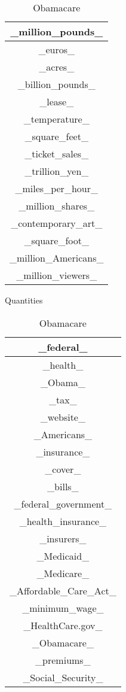 \documentclass{article}
\begin{document}
\begin{table}[ht]
{\begin{tabular}{|c|}
    \hline
    \_million\_pounds\_\\
    \hline
    \_euros\_\\
    \hline
    \_acres\_\\
    \hline
    \_billion\_pounds\_\\
    \hline
    \_lease\_\\
    \hline
    \_temperature\_\\
    \hline
    \_square\_feet\_\\
    \hline
    \_ticket\_sales\_\\
    \hline
    \_trillion\_yen\_\\
    \hline
    \_miles\_per\_hour\_\\
    \hline
    \_million\_shares\_\\
    \hline
    \_contemporary\_art\_\\
    \hline
    \_square\_foot\_\\
    \hline
    \_million\_Americans\_\\
    \hline
    \_million\_viewers\_\\
    \hline
    \end{tabular}
    \caption{Quantities}
    }
    \hfill
    \parbox{.24\linewidth}{
    \centering
    \begin{tabular}{|c|}
    \hline
    \_federal\_\\
    \hline
    \_health\_\\
    \hline
    \_Obama\_\\
    \hline
    \_tax\_\\
    \hline
    \_website\_\\
    \hline
    \_Americans\_\\
    \hline
    \_insurance\_\\
    \hline
    \_cover\_\\
    \hline
    \_bills\_\\
    \hline
    \_federal\_government\_\\
    \hline
    \_health\_insurance\_\\
    \hline
    \_insurers\_\\
    \hline
    \_Medicaid\_\\
    \hline
    \_Medicare\_\\
    \hline
    \_Affordable\_Care\_Act\_\\
    \hline
    \_minimum\_wage\_\\
    \hline
    \_HealthCare.gov\_\\
    \hline
    \_Obamacare\_\\
    \hline
    \_premiums\_\\
    \hline
    \_Social\_Security\_\\
    \hline
    \end{tabular}
    \caption{Obamacare}
    }
\end{table}\\
\end{document}
